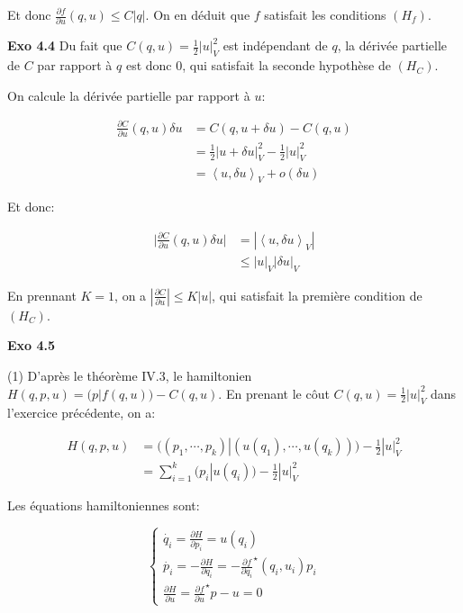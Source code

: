 \documentclass[11pt]{article}
\begin{document}
    Et donc $\frac{\partial f}{\partial u} (q, u) \le C |q|$. On en déduit que $f$ satisfait les conditions $(H_f)$.

    \textbf{Exo 4.4} Du fait que $C(q,u) = \frac{1}{2} |u|^2_V$ est indépendant de $q$, la dérivée partielle de $C$ par rapport à $q$ est donc $0$, qui satisfait la seconde hypothèse de $(H_C)$.

    On calcule la dérivée partielle par rapport à $u$:

    \vspace{-4em}
    \begin{align*} 
      \frac{\partial C}{\partial u} (q, u) \delta u &= C(q, u + \delta u) - C(q, u) \\
      &= \frac{1}{2} |u + \delta u|_V^2 - \frac{1}{2} |u|_V^2 \\
      &= \left \langle u, \delta u \right \rangle_V + o(\delta u) 
    \end{align*}
    \vspace{-4em}

    Et donc:

    \vspace{-4em}
    \begin{align*} 
      \Big |\frac{\partial C}{\partial u} (q, u) \delta u\Big| &= |\left \langle u, \delta u \right \rangle_V | \\
      &\le |u|_V |\delta u|_V
    \end{align*}
    \vspace{-4em}

    En prennant $K = 1$, on a $|\frac{\partial C}{\partial u}| \le K|u|$, qui satisfait la première condition de $(H_C)$.

    \textbf{Exo 4.5} 

    (1) D'après le théorème IV.3, le hamiltonien $H(q, p, u) = \big (p | f(q, u) \big ) - C(q, u)$. En prenant le côut $C(q, u) = \frac{1}{2} |u|^2_V $ dans l'exercice précédente, on a:

    \vspace{-4em}
    \begin{align*} 
      H(q, p, u) &= \big ((p_1, \cdots, p_k )| (u(q_1), \cdots, u(q_k)) \big ) - \frac{1}{2} |u|_V^2 \\
      &= \sum_{i=1}^k (p_i | u(q_i)) - \frac{1}{2}|u|_V^2
    \end{align*}
    \vspace{-4em}

    Les équations hamiltoniennes sont:

    \vspace{-2em}
    $$
    \begin{cases} 
    \dot{q_i} = \frac{\partial H}{\partial p_i} = u(q_i)\\
    \dot{p_i} = -\frac{\partial H}{\partial q_i} = - \frac{\partial f}{\partial q_i}^\star (q_i, u_i) p_i\\
    \frac{\partial H}{\partial u} = \frac{\partial f}{\partial u}^\star p - u = 0
    \end{cases}
    $$
    \vspace{-2em}
\end{document}
